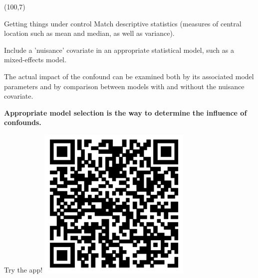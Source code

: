 \documentclass[final]{beamer}
\begin{document}
\begin{frame}{}
\begin{textblock}{48}
\end{textblock}

\begin{textblock}{18}(100,7)

\begin{block}{Getting things under control}
Match descriptive statistics (measures of central location such as mean and median, as well as variance).

\vspace{0.8cm}

Include a 'nuisance' covariate in an appropriate statistical model, such as a mixed-effects model.

\vspace{0.8cm}

The actual impact of the confound can be examined both by its associated model parameters and by comparison between models with and without the nuisance covariate.

\vspace{0.8cm}

\textbf{Appropriate model selection is the way to determine the influence of confounds.}

\end{block}

%
%

\begin{block}{Try the app!}
\centering
\includegraphics[width=0.55\textwidth]{shinyapps-url.eps}
%
\end{block}


\end{textblock}
\end{frame}
\end{document}
